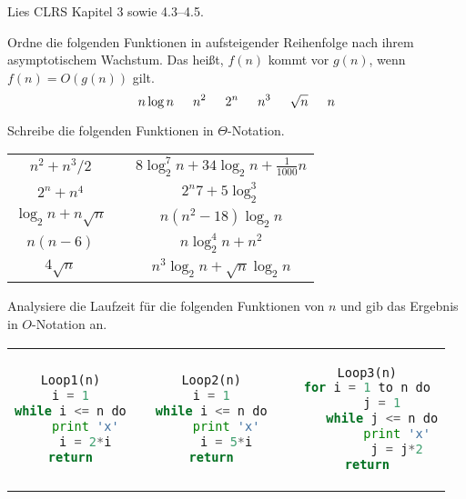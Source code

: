 \documentclass{uebung_cs}
\begin{document}
\begin{aufgabe}\label{lesen}
	Lies CLRS Kapitel 3 sowie 4.3--4.5.
\end{aufgabe}

\begin{aufgabe}\label{tue-first}\mbox{}
	Ordne die folgenden Funktionen in aufsteigender Reihenfolge nach ihrem asymptotischem Wachstum.
	Das heißt, $f(n)$ kommt vor $g(n)$, wenn $f(n) = O(g(n))$ gilt.
	\[n \log n\hspace*{15pt} n^2\hspace*{15pt} 2^n\hspace*{15pt} n^3\hspace*{15pt} \sqrt{n}\hspace*{15pt} n\]
	
\end{aufgabe}

\begin{aufgabe}
	Schreibe die folgenden Funktionen in $\Theta$-Notation.
	\begin{center}
		\begin{tabular}{ccc}
			$n^2 + n^3/2$
			&\mbox{}\hspace{2cm}\mbox{}&
			$8\log_2^7 n + 34\log_2 n + \frac{1}{1000}n$\\
			$2^n + n^4$&&
			$2^n7 + 5\log_2^3$\\
			$\log_2n + n\sqrt{n}$&&
			$n(n^2 - 18)\log_2 n$\\
			$n(n-6)$&&
			$n\log_2^4 n + n^2$\\
			$4\sqrt{n}$&&
			$n^3 \log_2 n + \sqrt{n}\log_2 n$
		\end{tabular}
	\end{center}
	
\end{aufgabe}

\begin{aufgabe}
	Analysiere die Laufzeit für die folgenden Funktionen von $n$ und gib das Ergebnis in $O$-Notation an.
	\begin{center}
		\begin{tabular}{ccccc}

\begin{lstlisting}[language=Python]
Loop1(n)
i = 1
while i <= n do
	print 'x'
	i = 2*i
return
\end{lstlisting}		
		
			&\mbox{}\hspace{2cm}\mbox{}&

\begin{lstlisting}[language=Python]
Loop2(n)
i = 1
while i <= n do
	print 'x'
	i = 5*i
return
\end{lstlisting}

			
			&\mbox{}\hspace{2cm}\mbox{}&
			
\begin{lstlisting}[language=Python]
Loop3(n)
for i = 1 to n do
	j = 1
	while j <= n do
		print 'x'
		j = j*2
return
\end{lstlisting}
		\end{tabular}
	\end{center}
\end{aufgabe}
\end{document}
